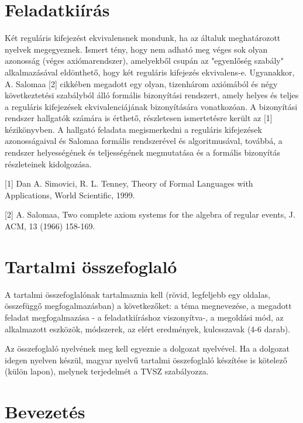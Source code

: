 \documentclass[12pt]{report}
\theoremstyle{definition}
\begin{document}
\chapter*{Feladatkiírás}


Két reguláris kifejezést ekvivalensnek mondunk, ha az általuk meghatározott nyelvek megegyeznek. Ismert tény, hogy nem adható meg véges sok olyan azonosság (véges axiómarendszer), amelyekből csupán az "egyenlőség szabály" alkalmazásával eldönthető, hogy két reguláris kifejezés ekvivalens-e. Ugyanakkor, A. Salomaa [2] cikkében megadott egy olyan, tizenhárom  axiómából és négy következtetési szabályból álló formális bizonyítási rendszert, amely helyes és teljes a reguláris kifejezések ekvivalenciájának bizonyítására vonatkozóan.
A bizonyítási rendszer hallgatók számára is érthető, részletesen ismertetésre került az [1] kézikönyvben.
A hallgató feladata megismerkedni a reguláris kifejezések azonosságaival és Salomaa formális rendszerével és algoritmusával, továbbá, a rendszer helyességének és teljességének megmutatása és a formális bizonyítás részleteinek kidolgozása.\newline

[1] Dan A. Simovici, R. L. Tenney, Theory of Formal Languages with Applications, World Scientific, 1999.
\newline

[2] A. Salomaa, Two complete axiom systems for the algebra of regular events, J. ACM, 13 (1966) 158-169.

\chapter*{Tartalmi összefoglaló}

A tartalmi összefoglalónak tartalmaznia kell (rövid, legfeljebb egy oldalas, összefüggő megfogalmazásban)
a következőket: a téma megnevezése, a megadott feladat megfogalmazása - a feladatkiíráshoz viszonyítva-,
a megoldási mód, az alkalmazott eszközök, módszerek, az elért eredmények, kulcsszavak (4-6 darab).

Az összefoglaló nyelvének meg kell egyeznie a dolgozat nyelvével. Ha a dolgozat idegen nyelven készül,
magyar nyelvű tartalmi összefoglaló készítése is kötelező (külön lapon), melynek terjedelmét a TVSZ szabályozza.


\chapter*{Bevezetés}
\end{document}
